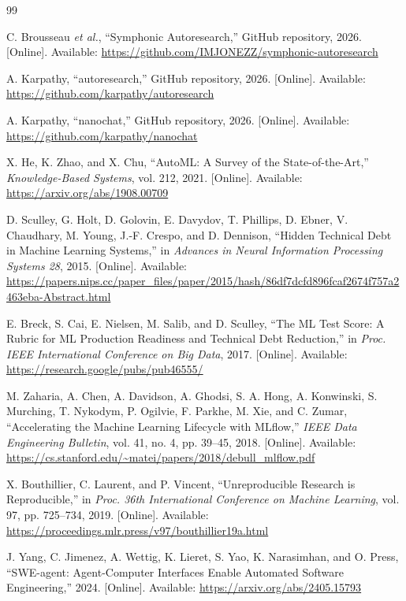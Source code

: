 \documentclass[conference]{IEEEtran}
\begin{document}
\balance
\begin{thebibliography}{99}

C. Brousseau \emph{et al.}, ``Symphonic Autoresearch,'' GitHub repository, 2026. [Online]. Available: \url{https://github.com/IMJONEZZ/symphonic-autoresearch}

A. Karpathy, ``autoresearch,'' GitHub repository, 2026. [Online]. Available: \url{https://github.com/karpathy/autoresearch}

A. Karpathy, ``nanochat,'' GitHub repository, 2026. [Online]. Available: \url{https://github.com/karpathy/nanochat}

X. He, K. Zhao, and X. Chu, ``AutoML: A Survey of the State-of-the-Art,'' \emph{Knowledge-Based Systems}, vol. 212, 2021. [Online]. Available: \url{https://arxiv.org/abs/1908.00709}

D. Sculley, G. Holt, D. Golovin, E. Davydov, T. Phillips, D. Ebner, V. Chaudhary, M. Young, J.-F. Crespo, and D. Dennison, ``Hidden Technical Debt in Machine Learning Systems,'' in \emph{Advances in Neural Information Processing Systems 28}, 2015. [Online]. Available: \url{https://papers.nips.cc/paper_files/paper/2015/hash/86df7dcfd896fcaf2674f757a2463eba-Abstract.html}

E. Breck, S. Cai, E. Nielsen, M. Salib, and D. Sculley, ``The ML Test Score: A Rubric for ML Production Readiness and Technical Debt Reduction,'' in \emph{Proc. IEEE International Conference on Big Data}, 2017. [Online]. Available: \url{https://research.google/pubs/pub46555/}

M. Zaharia, A. Chen, A. Davidson, A. Ghodsi, S. A. Hong, A. Konwinski, S. Murching, T. Nykodym, P. Ogilvie, F. Parkhe, M. Xie, and C. Zumar, ``Accelerating the Machine Learning Lifecycle with MLflow,'' \emph{IEEE Data Engineering Bulletin}, vol. 41, no. 4, pp. 39--45, 2018. [Online]. Available: \url{https://cs.stanford.edu/~matei/papers/2018/debull_mlflow.pdf}

X. Bouthillier, C. Laurent, and P. Vincent, ``Unreproducible Research is Reproducible,'' in \emph{Proc. 36th International Conference on Machine Learning}, vol. 97, pp. 725--734, 2019. [Online]. Available: \url{https://proceedings.mlr.press/v97/bouthillier19a.html}

J. Yang, C. Jimenez, A. Wettig, K. Lieret, S. Yao, K. Narasimhan, and O. Press, ``SWE-agent: Agent-Computer Interfaces Enable Automated Software Engineering,'' 2024. [Online]. Available: \url{https://arxiv.org/abs/2405.15793}


\end{thebibliography}
\end{document}
